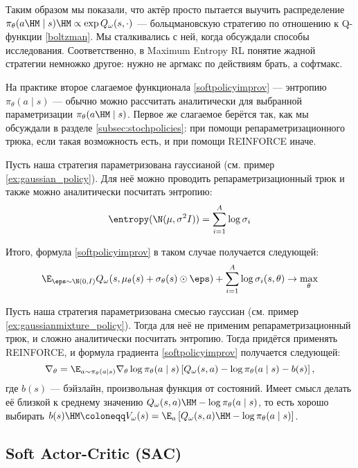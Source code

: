 Таким образом мы показали, что актёр просто пытается выучить распределение $\pi_\theta(a \HM\mid s) \HM\propto \exp{Q_\omega(s, \cdot)}$ --- больцмановскую стратегию по отношению к Q-функции \eqref{boltzman}. Мы сталкивались с ней, когда обсуждали способы исследования. Соответственно, в Maximum Entropy RL понятие жадной стратегии немножко другое: нужно не аргмакс по действиям брать, а софтмакс.

На практике второе слагаемое функционала \eqref{softpolicyimprov} --- энтропию $\pi_\theta(a \mid s)$ --- обычно можно рассчитать аналитически для выбранной параметризации $\pi_{\theta}(a \HM\mid s)$. Первое же слагаемое берётся так, как мы обсуждали в разделе \ref{subsec:stochpolicies}: при помощи репараметризационного трюка, если такая возможность есть, и при помощи REINFORCE иначе.

\begin{exampleBox}[label=ex:gaussianactor_sac]{}
Пусть наша стратегия параметризована гауссианой (см. пример \ref{ex:gaussian_policy}). Для неё можно проводить репараметризационный трюк и также можно аналитически посчитать энтропию:
$$\entropy(\N(\mu, \sigma^2I)) = \sum_{i=1}^{A} \log \sigma_i$$

Итого, формула \eqref{softpolicyimprov} в таком случае получается следующей:
$$\E_{\eps \sim \N(0, I)} Q_\omega(s, \mu_\theta(s) + \sigma_\theta(s) \odot \eps) + \sum_{i=1}^A \log \sigma_i(s, \theta) \to \max_\theta $$
\end{exampleBox}

\begin{exampleBox}[label=ex:gaussianmixtureactor_sac]{}
Пусть наша стратегия параметризована смесью гауссиан (см. пример \ref{ex:gaussianmixture_policy}). Тогда для неё не применим репараметризационный трюк, и сложно аналитически посчитать энтропию. Тогда придётся применять REINFORCE, и  формула градиента \eqref{softpolicyimprov} получается следующей:
$$\nabla_\theta = \E_{a \sim \pi_\theta(a \mid s)} \nabla_\theta \log \pi_\theta(a \mid s) \left[ Q_\omega(s, a) - \log \pi_\theta(a \mid s) - b(s) \right],$$
где $b(s)$ --- бэйзлайн, произвольная функция от состояний. Имеет смысл делать её близкой к среднему значению $Q_\omega(s, a) \HM- \log \pi_\theta(a \mid s)$, то есть хорошо выбирать $b(s) \HM\coloneqq V_\omega(s) = \E_{a} \left[ Q_\omega(s, a) \HM- \log \pi_\theta(a \mid s) \right]$.
\end{exampleBox}

\subsection{Soft Actor-Critic (SAC)}

